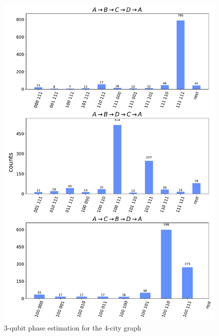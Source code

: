 \documentclass[msc,oneside]{ubcthesis}
\begin{document}
	\begin{figure}[!h]
		\centering
		\includegraphics[width=\textwidth,height=0.9\textheight,keepaspectratio]{"graphics/3qubit-4city"}
		\caption{3-qubit phase estimation for the 4-city graph}
		\label{fig:4-city-graphic-3}
	\end{figure}		
	
\end{document}
